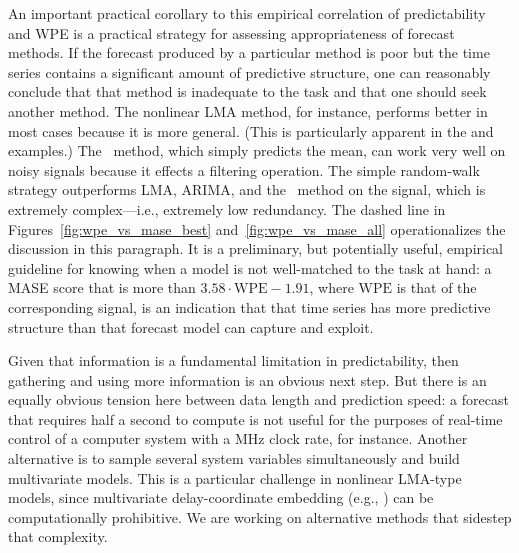 An important practical corollary to this empirical correlation of
predictability and WPE is a practical strategy for assessing
appropriateness of forecast methods.  If the forecast produced by a
particular method is poor but the time series contains a significant
amount of predictive structure, one can reasonably conclude that that
method is inadequate to the task and that one should seek another
method.  The nonlinear LMA method, for instance, performs better in
most cases because it is more general.  (This is particularly apparent
in the \col and \svdfive examples.)
The \naive ~method, which simply predicts the mean, can work very well
on noisy signals because it effects a filtering operation.  The simple
random-walk strategy outperforms LMA, ARIMA, and the \naive ~method on
the \gcc signal, which is extremely complex---i.e., extremely low
redundancy.
The dashed line in Figures~\ref{fig:wpe_vs_mase_best}
and~\ref{fig:wpe_vs_mase_all} operationalizes the discussion in this
paragraph.  It is a preliminary, but potentially useful, empirical
guideline for knowing when a model is not well-matched to the task at
hand: a MASE score that is more than $3.58 \cdot \mathrm{WPE} - 1.91$,
where $\mathrm{WPE}$ is that of the corresponding signal, is an
indication that that time series has more predictive structure than
that forecast model can capture and exploit.

Given that information is a fundamental limitation in predictability,
then gathering and using more information is an obvious next step.
But there is an equally obvious tension here between data length and
prediction speed: a forecast that requires half a second to compute is
not useful for the purposes of real-time control of a computer system
with a MHz clock rate, for instance.  Another alternative is to sample
several system variables simultaneously and build multivariate models.
This is a particular challenge in nonlinear LMA-type models, since
multivariate delay-coordinate embedding (e.g.,
\cite{cao-multivariate-embedding,deyle-sugihara2011}) can be
computationally prohibitive.  We are working on alternative methods
that sidestep that complexity.


